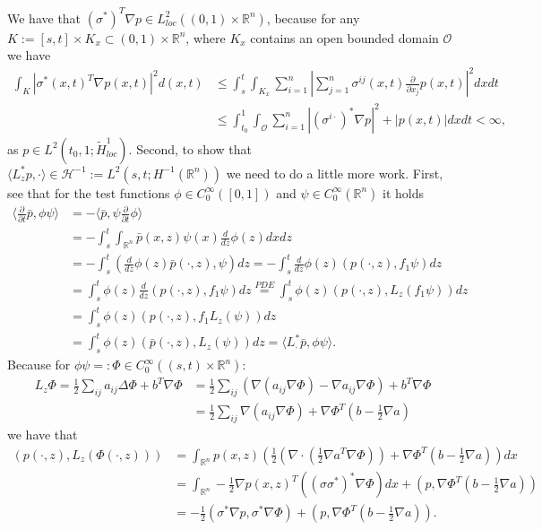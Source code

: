 \documentclass[a4paper,12pt,twoside]{article}
\begin{document}
We have that $(\sigma^*)^T \nabla p \in L_{loc}^2( (0,1) \times \mathbb{R}^n)$, because for any $K:= [s,t] \times K_x \subset (0,1) \times \mathbb{R}^n$, where $K_x$ contains an open bounded domain $\mathcal{O}$ we have 
\begin{align*}
    \int_K |\sigma^* (x,t)^T \nabla p(x,t) |^2 d(x,t) & \leq \int_s^t \int_{K_x} \sum_{i=1}^n | \sum_{j=1}^n \sigma^{ij} (x,t) \frac{\partial}{\partial x_j} p(x,t) |^2 dx dt \\
    &\leq \int_{t_0}^1 \int_\mathcal{O} \sum_{i=1}^n | (\sigma^{i\cdot})^* \nabla p |^2 + |p(x,t)| dx dt < \infty, 
\end{align*}
as $p \in L^2(t_0,1; \tilde{H}_{loc}^1)$. Second, to show that $\langle L_z^* p, \cdot \rangle \in \mathcal{H}^{-1} := L^2(s,t; H^{-1} (\mathbb{R}^n))$ we need to do a little more work. First, see that for the test functions $\phi \in C_0^\infty ([0,1])$ and $\psi \in C_0^\infty (\mathbb{R}^n)$ it holds 
\begin{align*}
\langle \frac{\partial}{\partial t} \bar{p}, \phi \psi \rangle &= - \langle \bar{p}, \psi \frac{\partial}{\partial t} \phi \rangle \\
&= - \int_s^t \int_{\mathbb{R}^n} \bar{p}(x,z) \psi (x) \frac{d}{dz} \phi (z) dx dz \\
&= - \int_s^t( \frac{d}{dz} \phi (z) \bar{p}(\cdot,z), \psi ) dz=- \int_s^t \frac{d}{dz} \phi (z) (p(\cdot,z), f_1 \psi)   dz  \\
&= \int_s^t \phi (z) \frac{d}{dz} (p(\cdot,z),f_1 \psi) dz \stackrel{PDE}{=} \int_s^t \phi (z) (p(\cdot,z), L_z (f_1 \psi)) dz \\
&= \int_s^t \phi (z) (p(\cdot,z), f_1 L_z ( \psi)) dz \\
&= \int_s^t \phi (z) (\bar{p}(\cdot,z),  L_z ( \psi)) dz = \langle L_\cdot^* \bar{p}, \phi \psi \rangle.
\end{align*} 
Because for $\phi \psi =:\Phi \in C_0^\infty((s,t)\times \mathbb{R}^n)$:
\begin{align*}
    L_z \Phi = \frac{1}{2} \sum_{ij} a_{ij} \Delta \Phi + b^T \nabla \Phi &= \frac{1}{2} \sum_{ij}( \nabla (a_{ij} \nabla \Phi) -\nabla a_{ij} \nabla \Phi )+ b^T \nabla \Phi \\
    &= \frac{1}{2} \sum_{ij} \nabla( a_{ij} \nabla \Phi ) + \nabla \Phi^T (b-\frac{1}{2} \nabla a )
\end{align*}
we have that 
\begin{align*}
    ( p(\cdot,z), L_z (\Phi(\cdot,z)) ) &= \int_{\mathbb{R}^n} p(x,z) ( \frac{1}{2}( \nabla \cdot (\frac{1}{2} \nabla a^T \nabla \Phi )) + \nabla \Phi^T (b -\frac{1}{2} \nabla a) ) dx \\
    &=\int_{\mathbb{R}^n} - \frac{1}{2} \nabla p(x,z)^T ( (\sigma \sigma^*)^* \nabla \Phi  )dx + (p, \nabla \Phi^T (b-\frac{1}{2} \nabla a) )\\
    &=- \frac{1}{2} ( \sigma^* \nabla p, \sigma^* \nabla \Phi ) + (p, \nabla \Phi^T (b-\frac{1}{2} \nabla a)).
\end{align*}
\end{document}
